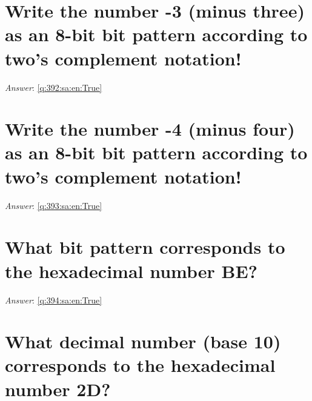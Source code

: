 \documentclass[a4paper,11pt,oneside]{book}
\begin{document}
\begin{sloppypar}
\section{Write the number -3 (minus three) as an 8-bit bit pattern according to two's complement notation!}

\label{q:392:sa:en:False}

\vspace{2cm}

\noindent\makebox[\textwidth]{\hrulefill}

\vspace{1cm}

\textit{Answer}: \autoref{q:392:sa:en:True}



\section{Write the number -4 (minus four) as an 8-bit bit pattern according to two's complement notation!}

\label{q:393:sa:en:False}

\vspace{2cm}

\noindent\makebox[\textwidth]{\hrulefill}

\vspace{1cm}

\textit{Answer}: \autoref{q:393:sa:en:True}



\section{What bit pattern corresponds to the hexadecimal number BE?}

\label{q:394:sa:en:False}

\vspace{2cm}

\noindent\makebox[\textwidth]{\hrulefill}

\vspace{1cm}

\textit{Answer}: \autoref{q:394:sa:en:True}



\section{What decimal number (base 10) corresponds to the hexadecimal number 2D?}

\label{q:395:sa:en:False}


\end{sloppypar}
\end{document}

